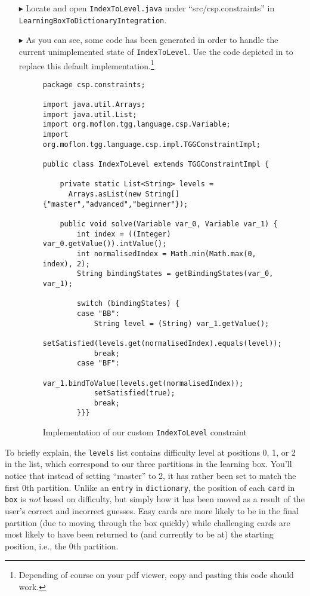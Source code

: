\begin{itemize}
\item[$\blacktriangleright$] Locate and open \texttt{IndexToLevel.java} under ``src/csp.constraints'' in \texttt{LearningBoxToDictionaryIntegration}.

\item[$\blacktriangleright$] As you can see, some code has been generated in order to handle the current unimplemented state of \texttt{IndexToLevel}. 
Use the code depicted in  to replace this default implementation.\footnote{Depending of course on your pdf viewer, copy and pasting this code should work.}

\begin{figure}[htb]
\begin{verbatim}
package csp.constraints;

import java.util.Arrays;
import java.util.List;
import org.moflon.tgg.language.csp.Variable;
import org.moflon.tgg.language.csp.impl.TGGConstraintImpl;

public class IndexToLevel extends TGGConstraintImpl {

    private static List<String> levels = 
      Arrays.asList(new String[] {"master","advanced","beginner"});

    public void solve(Variable var_0, Variable var_1) {
        int index = ((Integer) var_0.getValue()).intValue();
        int normalisedIndex = Math.min(Math.max(0, index), 2);
        String bindingStates = getBindingStates(var_0, var_1);
        
        switch (bindingStates) {
        case "BB":
            String level = (String) var_1.getValue();
            setSatisfied(levels.get(normalisedIndex).equals(level));
            break;
        case "BF":
            var_1.bindToValue(levels.get(normalisedIndex));
            setSatisfied(true);
            break;
        }}}
\end{verbatim}
  \caption{Implementation of our custom \texttt{IndexToLevel} constraint}
  \label{code:indexToLevel}
\end{figure}

\end{itemize}

To briefly explain, the \texttt{levels} list contains difficulty level at positions 0, 1, or 2 in the list, which correspond to our three partitions in the learning box. 
You'll notice that instead of setting ``master'' to 2, it has rather been set to match the first 0th partition. 
Unlike an \texttt{entry} in \texttt{dictionary}, the position of each \texttt{card} in \texttt{box} is \emph{not} based on difficulty, but simply how it has been moved as a result of the user's correct and incorrect guesses. 
Easy cards are more likely to be in the final partition (due to moving through the box quickly) while challenging cards are most likely to have been returned to (and currently to be at) the starting position, i.e., the 0th partition.

